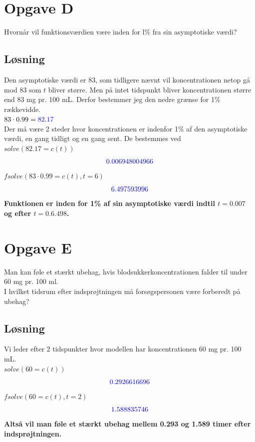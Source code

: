 \documentclass[a4paper, 11pt]{article}
\begin{document}
\section*{Opgave D} 
Hvornår vil funktionsværdien være inden for l\% fra sin asymptotiske værdi?
\subsection*{Løsning}
Den asymptotiske værdi er 83, som tidligere nævnt vil koncentrationen netop gå mod 83 som \(t\) bliver større. 
Men på intet tidspunkt bliver koncentrationen større end 83 mg pr. 100 mL. Derfor bestemmer jeg den nedre grænse for 1\% rækkevidde.\\ 
\(83 \cdot 0.99 = \textcolor{blue}{82.17}\)\\
Der må være 2 steder hvor koncentrationen er indenfor 1\% af den asymptotiske værdi, en gang tidligt og en gang sent. De bestemmes ved\\
\(solve(82.17=c(t))\)
\[\textcolor{blue}{0.006948004966}\]
\(\mathit{fsolve}\left(83\cdot  0.99=c\left(t\right),t=6\right)\)
\[\textcolor{blue}{6.497593996}\]
\textbf{Funktionen er inden for 1\% af sin asymptotiske værdi indtil \(t=0.007\) og efter \(t=0.6.498\).}
\section*{Opgave E} 
Man kan føle et stærkt ubehag, hvis blodsukkerkoncentrationen falder til under 60 mg pr. 100 ml. \\
I hvilket tidsrum efter indsprøjtningen må forsøgspersonen være forberedt på ubehag?
\subsection*{Løsning}
Vi leder efter 2 tidspunkter hvor modellen har koncentrationen 60 mg pr. 100 mL. \\
\(solve(60 = c(t))\)
\[\textcolor{blue}{0.2926616696}\]
\(fsolve(60 = c(t), t=2)\)
\[\textcolor{blue}{1.588835746}\]
\textbf{Altså vil man føle et stærkt ubehag mellem 0.293 og 1.589 timer efter indsprøjtningen.}
\end{document}
